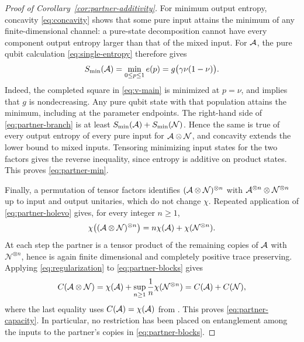 \begin{proof}[Proof of Corollary~\ref{cor:partner-additivity}]
For minimum output entropy, concavity \eqref{eq:concavity} shows that
some pure input attains the minimum of any finite-dimensional channel:
a pure-state decomposition cannot have every component output entropy
larger than that of the mixed input. For $\mathcal A$, the pure qubit calculation
\eqref{eq:single-entropy} therefore gives
\begin{equation}\label{eq:minimum-output-value}
 S_{\min}(\mathcal A)=\min_{0\le p\le1}e(p)
              =g\bigl(\gamma\nu(1-\nu)\bigr).
\end{equation}
Indeed, the completed square in \eqref{eq:v-main} is minimized at
$p=\nu$, and  implies that $g$ is
nondecreasing. Any pure qubit state with that population attains the
minimum, including at the parameter endpoints.
The right-hand side of \eqref{eq:partner-branch} is at least
$S_{\min}(\mathcal A)+S_{\min}(\mathcal N)$. Hence the same is true of every
output entropy of every pure input for $\mathcal A\otimes\mathcal N$, and concavity
extends the lower bound to mixed inputs. Tensoring minimizing input
states for the two factors gives the reverse inequality, since entropy
is additive on product states. This proves \eqref{eq:partner-min}.

Finally, a permutation of tensor factors identifies
$(\mathcal A\otimes\mathcal N)^{\otimes n}$ with
$\mathcal A^{\otimes n}\otimes\mathcal N^{\otimes n}$ up to input and output
unitaries, which do not change $\chi$. Repeated application of
\eqref{eq:partner-holevo} gives, for every integer $n\ge1$,
\begin{equation}\label{eq:partner-blocks}
 \chi\bigl((\mathcal A\otimes\mathcal N)^{\otimes n}\bigr)
 =n\chi(\mathcal A)+\chi(\mathcal N^{\otimes n}).
\end{equation}
At each step the partner is a tensor product of the remaining copies
of $\mathcal A$ with $\mathcal N^{\otimes n}$, hence is again finite dimensional
and completely positive trace preserving. Applying
\eqref{eq:regularization} to \eqref{eq:partner-blocks} gives
\[
 C(\mathcal A\otimes\mathcal N)
 =\chi(\mathcal A)+\sup_{n\ge1}\frac1n\chi(\mathcal N^{\otimes n})
 =C(\mathcal A)+C(\mathcal N),
\]
where the last equality uses $C(\mathcal A)=\chi(\mathcal A)$ from .
This proves \eqref{eq:partner-capacity}. In particular, no restriction
has been placed on entanglement among the inputs to the partner's
copies in \eqref{eq:partner-blocks}.
\end{proof}
